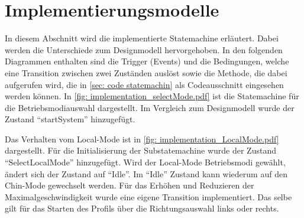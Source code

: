 \documentclass[./\jobname.tex]{subfiles}
\begin{document}
\section{Implementierungsmodelle}
\label{sec: Implementierungsmodelle}
%
In diesem Abschnitt wird die implementierte Statemachine erläutert. Dabei werden die Unterschiede zum Designmodell hervorgehoben. In den folgenden Diagrammen enthalten sind die Trigger (Events) und die Bedingungen, welche eine Transition zwischen zwei Zuständen auslöst sowie die Methode, die dabei aufgerufen wird, die in \autoref{sec: code statemachin} als Codeausschnitt eingesehen werden können. In \autoref{fig: implementation_selectMode.pdf} ist die Statemachine für die Betriebsmodiauswahl dargestellt. Im Vergleich zum Designmodell wurde der Zustand \enquote{startSystem} hinzugefügt.
%
\begin{figure}[H]
	\centering
	\noindent{}
	\label{fig: implementation_selectMode.pdf}
\end{figure}
%
\newpage
Das Verhalten vom Local-Mode ist in \autoref{fig: implementation_LocalMode.pdf} dargestellt. Für die Initialisierung der Substatemachine wurde der Zustand \enquote{SelectLocalMode} hinzugefügt. Wird der Local-Mode Betriebsmodi gewählt, ändert sich der Zustand auf \enquote{Idle}. Im \enquote{Idle} Zustand kann wiederum auf den Chin-Mode gewechselt werden. Für das Erhöhen und Reduzieren der Maximalgeschwindigkeit wurde eine eigene Transition implementiert. Das selbe gilt für das Starten des Profils über die Richtungsauswahl links oder rechts.
\end{document}
